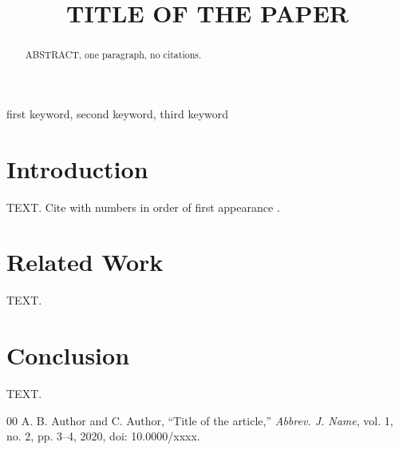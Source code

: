 \documentclass[conference]{IEEEtran}
\begin{document}
\normalfont\rmfamily   %

\title{TITLE OF THE PAPER}

\author{
}

\maketitle

\begin{abstract}
ABSTRACT, one paragraph, no citations.
\end{abstract}

\begin{IEEEkeywords}
first keyword, second keyword, third keyword
\end{IEEEkeywords}

\section{Introduction}
TEXT. Cite with numbers in order of first appearance \cite{key1}.

\section{Related Work}
TEXT.

\section{Conclusion}
TEXT.


\begin{thebibliography}{00}
 A. B. Author and C. Author, ``Title of the article,'' \emph{Abbrev. J. Name}, vol. 1, no. 2, pp. 3--4, 2020, doi: 10.0000/xxxx.
\end{thebibliography}
\end{document}
